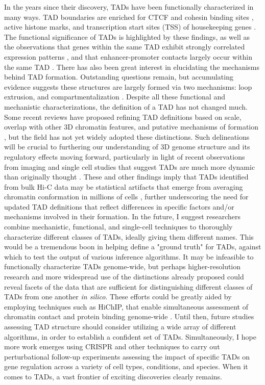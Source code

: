 In the years since their discovery, TADs have been functionally characterized in many ways. TAD boundaries are enriched for CTCF and cohesin binding sites \cite{Dixon.2012, Rao.2014, Bortle.2014}, active histone marks, and transcription start sites (TSS) of housekeeping genes \cite{Szabo.2019, Hou.2012, Ramírez.2018}. The functional significance of TADs is highlighted by these findings, as well as the observations that genes within the same TAD exhibit strongly correlated expression patterns \cite{Nora.2012, Ramírez.2018, Symmons.2014}, and that enhancer-promoter contacts largely occur within the same TAD \cite{Bonev.2017, Symmons.2016, Smith.2016, Delaneau.2019}. There has also been great interest in elucidating the mechanisms behind TAD formation. Outstanding questions remain, but accumulating evidence suggests these structures are largely formed via two mechanisms: loop extrusion, and compartmentalization \cite{Nuebler.2018, Fudenberg.2016, Sanborn.2015, Rowley.2017, Eagen.2017}. Despite all these functional and mechanistic characterizations, the definition of a TAD has not changed much. Some recent reviews have proposed refining TAD definitions based on scale, overlap with other 3D chromatin features, and putative mechanisms of formation \cite{Dixon.2016, Beagan.2020}, but the field has not yet widely adopted these distinctions. Such delineations will be crucial to furthering our understanding of 3D genome structure and its regulatory effects moving forward, particularly in light of recent observations from imaging and single cell studies that suggest TADs are much more dynamic than originally thought \cite{Gizzi.2020, Finn.2019}. These and other findings imply that TADs identified from bulk Hi-C data may be statistical artifacts that emerge from averaging chromatin conformation in millions of cells \cite{Wit.2019)}, further underscoring the need for updated TAD definitions that reflect differences in specific factors and/or mechanisms involved in their formation. In the future, I suggest researchers combine mechanistic, functional, and single-cell techniques to thoroughly characterize different classes of TADs, ideally giving them different names. This would be a tremendous boon in helping define a "ground truth" for TADs, against which to test the output of various inference algorithms. It may be infeasible to functionally characterize TADs genome-wide, but perhaps higher-resolution research and more widespread use of the distinctions already proposed could reveal facets of the data that are sufficient for distinguishing different classes of TADs from one another \textit{in silico}. These efforts could be greatly aided by employing techniques such as HiChIP, that enable simultaneous assessment of chromatin contact and protein binding genome-wide \cite{Mumbach.2016}. Until then, future studies assessing TAD structure should consider utilizing a wide array of different algorithms, in order to establish a confident set of TADs. Simultaneously, I hope more work emerges using CRISPR and other techniques to carry out perturbational follow-up experiments assessing the impact of specific TADs on gene regulation across a variety of cell types, conditions, and species. When it comes to TADs, a vast frontier of exciting discoveries clearly remains.

